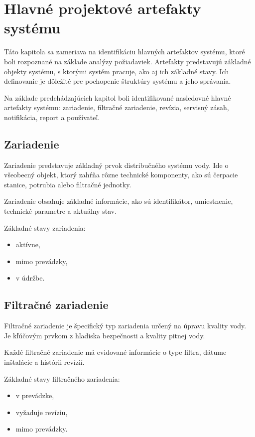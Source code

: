 
\chapter{Hlavné projektové artefakty systému}\label{ch:system-artefacts}

Táto kapitola sa zameriava na identifikáciu hlavných artefaktov systému, ktoré boli rozpoznané na základe analýzy požiadaviek. Artefakty predstavujú základné objekty systému, s ktorými systém pracuje, ako aj ich základné stavy. Ich definovanie je dôležité pre pochopenie štruktúry systému a jeho správania.

Na základe predchádzajúcich kapitol boli identifikované nasledovné hlavné artefakty systému: zariadenie, filtračné zariadenie, revízia, servisný zásah, notifikácia, report a používateľ.

\section{Zariadenie}

Zariadenie predstavuje základný prvok distribučného systému vody. Ide o všeobecný objekt, ktorý zahŕňa rôzne technické komponenty, ako sú čerpacie stanice, potrubia alebo filtračné jednotky.

Zariadenie obsahuje základné informácie, ako sú identifikátor, umiestnenie, technické parametre a aktuálny stav.

Základné stavy zariadenia:
\begin{itemize}
    \item aktívne,
    \item mimo prevádzky,
    \item v údržbe.
\end{itemize}

\section{Filtračné zariadenie}

Filtračné zariadenie je špecifický typ zariadenia určený na úpravu kvality vody. Je kľúčovým prvkom z hľadiska bezpečnosti a kvality pitnej vody.

Každé filtračné zariadenie má evidované informácie o type filtra, dátume inštalácie a histórii revízií.

Základné stavy filtračného zariadenia:
\begin{itemize}
    \item v prevádzke,
    \item vyžaduje revíziu,
    \item mimo prevádzky.
\end{itemize}

